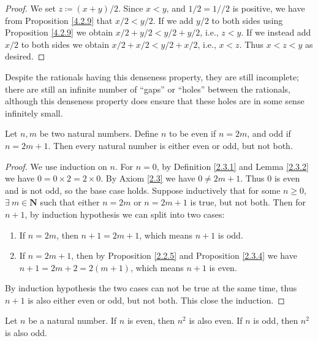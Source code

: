 \begin{proof}
    We set \(z \coloneqq (x + y) / 2\).
    Since \(x < y\), and \(1 / 2 = 1 // 2\) is positive, we have from Proposition \ref{4.2.9} that \(x / 2 < y / 2\).
    If we add \(y / 2\) to both sides using Proposition \ref{4.2.9} we obtain \(x / 2 + y / 2 < y / 2 + y / 2\), i.e., \(z < y\).
    If we instead add \(x / 2\) to both sides we obtain \(x / 2 + x / 2 < y / 2 + x / 2\), i.e., \(x < z\).
    Thus \(x < z < y\) as desired.
\end{proof}

\begin{note}
    Despite the rationals having this denseness property, they are still incomplete;
    there are still an infinite number of ``gaps'' or ``holes'' between the rationals, although this denseness property does ensure that these holes are in some sense infinitely small.
\end{note}

\begin{additional corollary}\label{ac 4.4.2}
Let \(n, m\) be two natural numbers.
Define \(n\) to be even if \(n = 2m\), and odd if \(n = 2m + 1\).
Then every natural number is either even or odd, but not both.
\end{additional corollary}

\begin{proof}
    We use induction on \(n\).
    For \(n = 0\), by Definition \ref{2.3.1} and Lemma \ref{2.3.2} we have \(0 = 0 \times 2 = 2 \times 0\).
    By Axiom \ref{2.3} we have \(0 \neq 2m + 1\).
    Thus \(0\) is even and is not odd, so the base case holds.
    Suppose inductively that for some \(n \geq 0\), \(\exists\ m \in \mathbf{N}\) such that either \(n = 2m\) or \(n = 2m + 1\) is true, but not both.
    Then for \(n + 1\), by induction hypothesis we can split into two cases:
    \begin{enumerate}
        \item If \(n = 2m\), then \(n + 1 = 2m + 1\), which means \(n + 1\) is odd.
        \item If \(n = 2m + 1\), then by Proposition \ref{2.2.5} and Proposition \ref{2.3.4} we have \(n + 1 = 2m + 2 = 2(m + 1)\), which means \(n + 1\) is even.
    \end{enumerate}
    By induction hypothesis the two cases can not be true at the same time, thus \(n + 1\) is also either even or odd, but not both.
    This close the induction.
\end{proof}

\begin{additional corollary}\label{ac 4.4.3}
Let \(n\) be a natural number.
If \(n\) is even, then \(n^2\) is also even.
If \(n\) is odd, then \(n^2\) is also odd.
\end{additional corollary}

